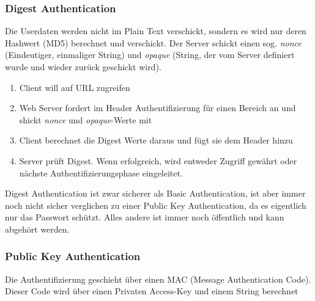 \documentclass[a4paper, 11pt]{article}
\begin{document}
\subsubsection{Digest Authentication}
Die Userdaten werden nicht im Plain Text verschickt, sondern es wird nur deren Hashwert (MD5) berechnet und verschickt. Der Server schickt einen sog. \textit{nonce} (Eindeutiger, einmaliger String) und \textit{opaque} (String, der vom Server definiert wurde und wieder zurück geschickt wird).
\begin{enumerate}
	\item Client will auf URL zugreifen
	\item Web Server fordert im Header Authentifizierung für einen Bereich an und shickt \textit{nonce} und \textit{opaque}-Werte mit
	\item Client berechnet die Digest Werte daraus und fügt sie dem Header hinzu
	\item Server prüft Digest. Wenn erfolgreich, wird entweder Zugriff gewährt oder nächste Authentifizierungsphase eingeleitet.
\end{enumerate}

Digest Authentication ist zwar sicherer als Basic Authentication, ist aber immer noch nicht sicher verglichen zu einer Public Key Authentication, da es eigentlich nur das Passwort schützt. Alles andere ist immer noch öffentlich und kann abgehört werden.

\newpage

\subsubsection{Public Key Authentication}
Die Authentifizierung geschieht über einen MAC (Message Authentication Code). Dieser Code wird über einen Privaten Access-Key und einem String berechnet
\end{document}
